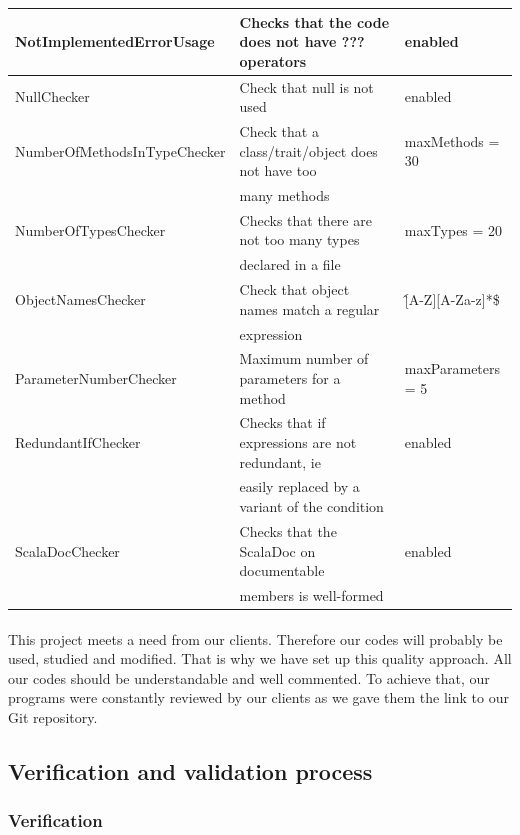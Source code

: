 \documentclass{report}
\begin{document}
\begin{center}
\begin{longtable}{|l|l|l|}
\small{NotImplementedErrorUsage} & \small{Checks that the code does not have ??? operators} & enabled \\
\hline
NullChecker & \small{Check that null is not used} & enabled \\
\hline
\small{NumberOfMethodsInTypeChecker} & \small{Check that a class/trait/object does not have too} & maxMethods = 30 \\
& \small{many methods} & \\
\hline
NumberOfTypesChecker & \small{Checks that there are not too many types} & maxTypes = 20 \\
& \small{declared in a file} & \\
\hline
ObjectNamesChecker & \small{Check that object names match a regular}  & \^[A-Z][A-Za-z]*\$ \\
& \small{expression} & \\
\hline
ParameterNumberChecker & \small{Maximum number of parameters for a method} & maxParameters = 5 \\
\hline
RedundantIfChecker & \small{Checks that if expressions are not redundant, ie} & enabled \\
& \small{easily replaced by a variant of the condition} &  \\
\hline
ScalaDocChecker & \small{Checks that the ScalaDoc on documentable}  & enabled \\
& \small{members is well-formed} & \\
\hline
\end{longtable} 
\end{center}
\paragraph{}
\hspace{4mm}This project meets a need from our clients. 
Therefore our codes will probably be used, studied and modified. 
That is why we have set up this quality approach. 
All our codes should be understandable and well commented. 
To achieve that, our programs were constantly reviewed by our clients
as we gave them the link to our Git repository.

\subsection{Verification and validation process}

\subsubsection{Verification}
\end{document}
